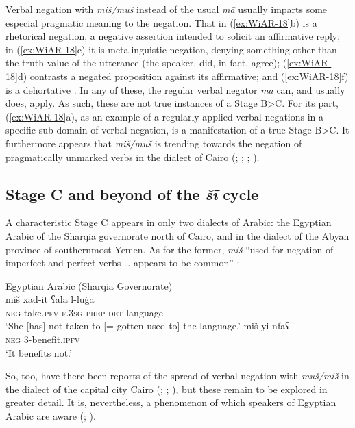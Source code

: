 \documentclass[output=paper,colorlinks,citecolor=brown]{langscibook}
\begin{document}
Verbal negation with \textit{miš/muš} instead of the usual \textit{mā} usually imparts some especial pragmatic meaning to the negation. That in (\ref{ex:WiAR-18}b) is a rhetorical negation, a negative assertion intended to solicit an affirmative reply; in (\ref{ex:WiAR-18}c) it is metalinguistic negation, denying something other than the truth value of the utterance (the speaker, did, in fact, agree); (\ref{ex:WiAR-18}d) contrasts a negated proposition against its affirmative; and (\ref{ex:WiAR-18}f) is a dehortative \citep{wilmsen2016b}. In any of these, the regular verbal negator \textit{mā} can, and usually does, apply. As such, these are not true instances of a Stage B>C. For its part, (\ref{ex:WiAR-18}a), as an example of a regularly applied verbal negations in a specific sub-domain of verbal negation, is a manifestation of a true Stage B>C. It furthermore appears that \textit{miš/muš} is trending towards the negation of pragmatically unmarked verbs in the dialect of Cairo (\citealp[303]{brustad2000a}; \citealp{doss2008a}; \citealp{h2011a}; \citealp[519]{wilmsen2020a}).

\subsection{Stage C and beyond of the \textit{šī} cycle} \label{s:WiAR-3.5}

A characteristic Stage C appears in only two dialects of Arabic: the Egyptian Arabic of the Sharqia governorate north of Cairo, and in the dialect of the Abyan province of southernmost Yemen. As for the former, \textit{miš} “used for negation of imperfect and perfect verbs … appears to be common” \citep[v, 70--72]{h2011a}:

\ea Egyptian Arabic (Sharqia Governorate)\label{ex:WiAR-19}\\
  \ea
  	\gll miš xad-it ʕalā l-luġa\\
  	\textsc{neg} take.\textsc{pfv-f.3sg} \textsc{prep} \textsc{det}-language \\
  	\glt ‘She [has] not taken to [= gotten used to] the language.’ \citep[59]{h2011a}
  \ex
  	\gll miš yi-nfaʕ\\
  	\textsc{neg} 3-benefit.\textsc{ipfv}\\
  	\glt ‘It benefits not.’ \citep[72]{h2011a} 
\z \z

So, too, have there been reports of the spread of verbal negation with \textit{muš/miš} in the dialect of the capital city Cairo (\citealp[301–306]{brustad2000a}; \citealp{doss2008a}; \citealp[525]{wilmsen2020a}), but these remain to be explored in greater detail. It is, nevertheless, a phenomenon of which speakers of Egyptian Arabic are aware (\citealp[301]{brustad2000a}; \citealp[65--72]{h2011a}).
\end{document}
